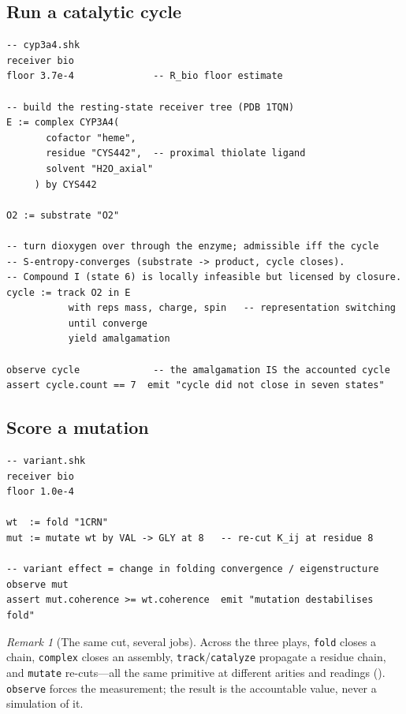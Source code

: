 \documentclass[11pt,a4paper]{article}
\theoremstyle{thmstyle}
\theoremstyle{definition}
\theoremstyle{remark}
\newtheorem{remark}[theorem]{Remark}
\newcommand{\shk}[1]{\texttt{#1}}
\begin{document}
\subsection{Run a catalytic cycle}

\begin{lstlisting}[caption={The cytochrome CYP3A4 seven-state cycle; the Miracle Principle licenses Compound I.}]
-- cyp3a4.shk
receiver bio
floor 3.7e-4              -- R_bio floor estimate

-- build the resting-state receiver tree (PDB 1TQN)
E := complex CYP3A4(
       cofactor "heme",
       residue "CYS442",  -- proximal thiolate ligand
       solvent "H2O_axial"
     ) by CYS442

O2 := substrate "O2"

-- turn dioxygen over through the enzyme; admissible iff the cycle
-- S-entropy-converges (substrate -> product, cycle closes).
-- Compound I (state 6) is locally infeasible but licensed by closure.
cycle := track O2 in E
           with reps mass, charge, spin   -- representation switching
           until converge
           yield amalgamation

observe cycle             -- the amalgamation IS the accounted cycle
assert cycle.count == 7  emit "cycle did not close in seven states"
\end{lstlisting}

\subsection{Score a mutation}

\begin{lstlisting}[caption={A point mutation as a re-cut of the coupling graph.}]
-- variant.shk
receiver bio
floor 1.0e-4

wt  := fold "1CRN"
mut := mutate wt by VAL -> GLY at 8   -- re-cut K_ij at residue 8

-- variant effect = change in folding convergence / eigenstructure
observe mut
assert mut.coherence >= wt.coherence  emit "mutation destabilises fold"
\end{lstlisting}

\begin{remark}[The same cut, several jobs]
\label{rem:same-keyword}
Across the three plays, \shk{fold} closes a chain, \shk{complex} closes an
assembly, \shk{track}/\shk{catalyze} propagate a residue chain, and
\shk{mutate} re-cuts---all the same primitive at different arities and
readings (). \shk{observe} forces the measurement; the
result is the accountable value, never a simulation of it.
\end{remark}
\end{document}
